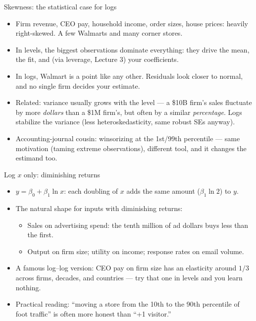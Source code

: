 \documentclass[aspectratio=169,11pt]{beamer}
\begin{document}
\begin{frame}{Skewness: the statistical case for logs}
\begin{itemize}
	\item Firm revenue, CEO pay, household income, order sizes, house prices:
	heavily \alert{right-skewed}. A few Walmarts and many corner stores.

	\medskip
	\item In levels, the biggest observations dominate everything: they drive the
	mean, the fit, and (via \alert{leverage}, Lecture 3) your coefficients.

	\medskip
	\item In logs, Walmart is a point like any other. Residuals look closer to normal,
	and no single firm decides your estimate.

	\medskip
	\item Related: variance usually grows with the level --- a \$10B firm's sales
	fluctuate by more \emph{dollars} than a \$1M firm's, but often by a similar
	\emph{percentage}. Logs stabilize the variance (less heteroskedasticity, same
	robust SEs anyway).

	\medskip
	\item Accounting-journal cousin: \alert{winsorizing} at the 1st/99th percentile
	--- same motivation (taming extreme observations), different tool, and it changes
	the estimand too.
\end{itemize}
\end{frame}


\begin{frame}{Log $x$ only: diminishing returns}
\begin{itemize}
	\item $y = \beta_0 + \beta_1 \ln x$: each \alert{doubling} of $x$ adds the same
	amount ($\beta_1 \ln 2$) to $y$.

	\medskip
	\item The natural shape for inputs with diminishing returns:
	\begin{itemize}
		\item Sales on \alert{advertising spend}: the tenth million of ad dollars
		buys less than the first.
		\item Output on firm size; utility on income; response rates on email volume.
	\end{itemize}

	\medskip
	\item A famous log--log version: CEO pay on firm size has an elasticity around
	$1/3$ across firms, decades, and countries --- try that one in levels and you
	learn nothing.

	\medskip
	\item Practical reading: ``moving a store from the 10th to the 90th percentile
	of foot traffic'' is often more honest than ``+1 visitor.''
\end{itemize}
\end{frame}
\end{document}
